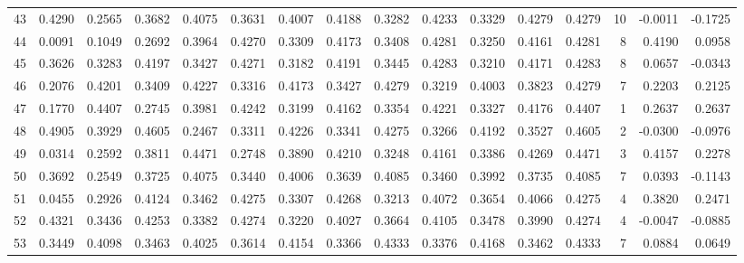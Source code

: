 \begin{tabular}{lrrrrrrrrrrrrrrr}
43  &      0.4290 &  0.2565 &  0.3682 &  0.4075 &  0.3631 &  0.4007 &  0.4188 &  0.3282 &  0.4233 &  0.3329 &   0.4279 &     0.4279 &     10 &                   -0.0011 &                    -0.1725 \\
44  &      0.0091 &  0.1049 &  0.2692 &  0.3964 &  0.4270 &  0.3309 &  0.4173 &  0.3408 &  0.4281 &  0.3250 &   0.4161 &     0.4281 &      8 &                    0.4190 &                     0.0958 \\
45  &      0.3626 &  0.3283 &  0.4197 &  0.3427 &  0.4271 &  0.3182 &  0.4191 &  0.3445 &  0.4283 &  0.3210 &   0.4171 &     0.4283 &      8 &                    0.0657 &                    -0.0343 \\
46  &      0.2076 &  0.4201 &  0.3409 &  0.4227 &  0.3316 &  0.4173 &  0.3427 &  0.4279 &  0.3219 &  0.4003 &   0.3823 &     0.4279 &      7 &                    0.2203 &                     0.2125 \\
47  &      0.1770 &  0.4407 &  0.2745 &  0.3981 &  0.4242 &  0.3199 &  0.4162 &  0.3354 &  0.4221 &  0.3327 &   0.4176 &     0.4407 &      1 &                    0.2637 &                     0.2637 \\
48  &      0.4905 &  0.3929 &  0.4605 &  0.2467 &  0.3311 &  0.4226 &  0.3341 &  0.4275 &  0.3266 &  0.4192 &   0.3527 &     0.4605 &      2 &                   -0.0300 &                    -0.0976 \\
49  &      0.0314 &  0.2592 &  0.3811 &  0.4471 &  0.2748 &  0.3890 &  0.4210 &  0.3248 &  0.4161 &  0.3386 &   0.4269 &     0.4471 &      3 &                    0.4157 &                     0.2278 \\
50  &      0.3692 &  0.2549 &  0.3725 &  0.4075 &  0.3440 &  0.4006 &  0.3639 &  0.4085 &  0.3460 &  0.3992 &   0.3735 &     0.4085 &      7 &                    0.0393 &                    -0.1143 \\
51  &      0.0455 &  0.2926 &  0.4124 &  0.3462 &  0.4275 &  0.3307 &  0.4268 &  0.3213 &  0.4072 &  0.3654 &   0.4066 &     0.4275 &      4 &                    0.3820 &                     0.2471 \\
52  &      0.4321 &  0.3436 &  0.4253 &  0.3382 &  0.4274 &  0.3220 &  0.4027 &  0.3664 &  0.4105 &  0.3478 &   0.3990 &     0.4274 &      4 &                   -0.0047 &                    -0.0885 \\
53  &      0.3449 &  0.4098 &  0.3463 &  0.4025 &  0.3614 &  0.4154 &  0.3366 &  0.4333 &  0.3376 &  0.4168 &   0.3462 &     0.4333 &      7 &                    0.0884 &                     0.0649 \\

\end{tabular}
